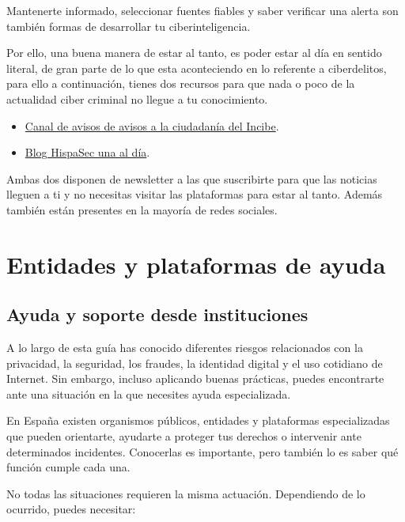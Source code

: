 \documentclass[
  spanish,
  a4paper,
  openany]{book}
\begin{document}
Mantenerte informado, seleccionar fuentes fiables y saber verificar una alerta son también formas de desarrollar tu ciberinteligencia.

Por ello, una buena manera de estar al tanto, es poder estar al día en sentido literal, de gran parte de lo que esta aconteciendo en lo referente a ciberdelitos, para ello a continuación, tienes dos recursos para que nada o poco de la actualidad ciber criminal no llegue a tu conocimiento.

\begin{itemize}
\item
  \href{https://www.incibe.es/ciudadania}{Canal de avisos de avisos a la ciudadanía del Incibe}.
\item
  \href{https://unaaldia.hispasec.com/}{Blog HispaSec una al día}.
\end{itemize}

Ambas dos disponen de newsletter a las que suscribirte para que las noticias lleguen a ti y no necesitas visitar las plataformas para estar al tanto. Además también están presentes en la mayoría de redes sociales.

\chapter{Entidades y plataformas de ayuda}\label{entidades-y-plataformas-de-ayuda}

\section{Ayuda y soporte desde instituciones}\label{ayuda-y-soporte-desde-instituciones}

A lo largo de esta guía has conocido diferentes riesgos relacionados con la privacidad, la seguridad, los fraudes, la identidad digital y el uso cotidiano de Internet. Sin embargo, incluso aplicando buenas prácticas, puedes encontrarte ante una situación en la que necesites ayuda especializada.

En España existen organismos públicos, entidades y plataformas especializadas que pueden orientarte, ayudarte a proteger tus derechos o intervenir ante determinados incidentes. Conocerlas es importante, pero también lo es saber qué función cumple cada una.

No todas las situaciones requieren la misma actuación. Dependiendo de lo ocurrido, puedes necesitar:
\end{document}
